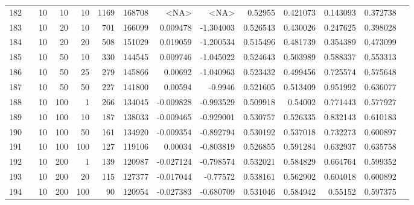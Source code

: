 \begin{longtable}{llrrrrrrrrrrrr}
		182 & &           10 &                10 &           10 &          1169 &     168708 &      <NA> &      <NA> &   0.52955 &    0.421073 &       0.143093 &  0.372738 \\
		183 & &           10 &                20 &           10 &         701 &     166099 &  0.009478 & -1.304003 &  0.526543 &    0.430026 &       0.247625 &  0.398028 \\
		184 & &           10 &                20 &           20 &         508 &     151029 &  0.019059 & -1.200534 &  0.515496 &    0.481739 &       0.354389 &  0.473099 \\
		185 & &           10 &                50 &           10 &         330 &     144545 &  0.009746 & -1.045022 &  0.524643 &    0.503989 &       0.588337 &  0.553313 \\
		186 & &           10 &                50 &           25 &         279 &     145866 &   0.00692 & -1.040963 &  0.523432 &    0.499456 &       0.725574 &  0.575648 \\
		187 & &           10 &                50 &           50 &         227 &     141800 &   0.00594 &   -0.9946 &  0.521605 &    0.513409 &       0.951992 &  0.636077 \\
		188 & &           10 &               100 &            1 &         266 &     134045 & -0.009828 & -0.993529 &  0.509918 &     0.54002 &       0.771443 &  0.577927 \\
		189 & &           10 &               100 &           10 &         187 &     138033 & -0.009465 & -0.929001 &  0.530757 &    0.526335 &       0.832143 &  0.610183 \\
		190 & &           10 &               100 &           50 &         161 &     134920 & -0.009354 & -0.892794 &  0.530192 &    0.537018 &       0.732273 &  0.600897 \\
		191 & &           10 &               100 &          100 &         127 &     119106 &   0.00034 & -0.803819 &  0.526855 &    0.591284 &       0.632937 &  0.635758 \\
		192 & &           10 &               200 &            1 &         139 &     120987 & -0.027124 & -0.798574 &  0.532021 &    0.584829 &       0.664764 &  0.599352 \\
		193 & &           10 &               200 &           20 &         115 &     127377 & -0.017044 &  -0.77572 &  0.538161 &    0.562902 &       0.604018 &  0.600892 \\
		194 & &           10 &               200 &          100 &          90 &     120954 & -0.027383 & -0.680709 &  0.531046 &    0.584942 &        0.55152 &  0.597375 \\

\end{longtable}
